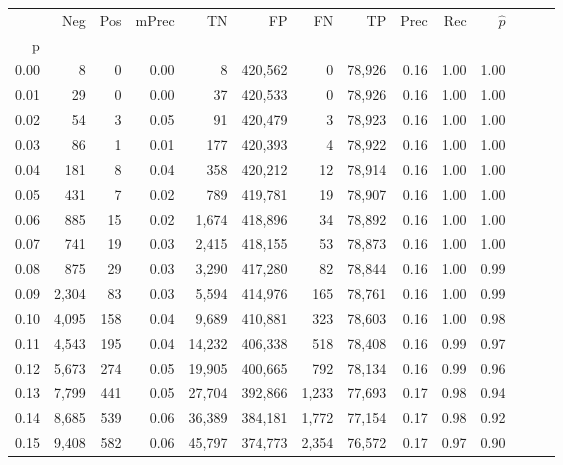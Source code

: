 \begin{tabular}{rrrrrrrrrrrrrr}
\toprule
{} &     Neg &    Pos & mPrec &       TN &       FP &      FN &      TP &  Prec &   Rec & $\hat{p}$ \\
p    &         &        &       &          &          &         &         &       &       &           \\
\midrule
0.00 &       8 &      0 &  0.00 &        8 &  420,562 &       0 &  78,926 &  0.16 &  1.00 &      1.00 \\
0.01 &      29 &      0 &  0.00 &       37 &  420,533 &       0 &  78,926 &  0.16 &  1.00 &      1.00 \\
0.02 &      54 &      3 &  0.05 &       91 &  420,479 &       3 &  78,923 &  0.16 &  1.00 &      1.00 \\
0.03 &      86 &      1 &  0.01 &      177 &  420,393 &       4 &  78,922 &  0.16 &  1.00 &      1.00 \\
0.04 &     181 &      8 &  0.04 &      358 &  420,212 &      12 &  78,914 &  0.16 &  1.00 &      1.00 \\
0.05 &     431 &      7 &  0.02 &      789 &  419,781 &      19 &  78,907 &  0.16 &  1.00 &      1.00 \\
0.06 &     885 &     15 &  0.02 &    1,674 &  418,896 &      34 &  78,892 &  0.16 &  1.00 &      1.00 \\
0.07 &     741 &     19 &  0.03 &    2,415 &  418,155 &      53 &  78,873 &  0.16 &  1.00 &      1.00 \\
0.08 &     875 &     29 &  0.03 &    3,290 &  417,280 &      82 &  78,844 &  0.16 &  1.00 &      0.99 \\
0.09 &   2,304 &     83 &  0.03 &    5,594 &  414,976 &     165 &  78,761 &  0.16 &  1.00 &      0.99 \\
0.10 &   4,095 &    158 &  0.04 &    9,689 &  410,881 &     323 &  78,603 &  0.16 &  1.00 &      0.98 \\
0.11 &   4,543 &    195 &  0.04 &   14,232 &  406,338 &     518 &  78,408 &  0.16 &  0.99 &      0.97 \\
0.12 &   5,673 &    274 &  0.05 &   19,905 &  400,665 &     792 &  78,134 &  0.16 &  0.99 &      0.96 \\
0.13 &   7,799 &    441 &  0.05 &   27,704 &  392,866 &   1,233 &  77,693 &  0.17 &  0.98 &      0.94 \\
0.14 &   8,685 &    539 &  0.06 &   36,389 &  384,181 &   1,772 &  77,154 &  0.17 &  0.98 &      0.92 \\
0.15 &   9,408 &    582 &  0.06 &   45,797 &  374,773 &   2,354 &  76,572 &  0.17 &  0.97 &      0.90 \\

\end{tabular}
